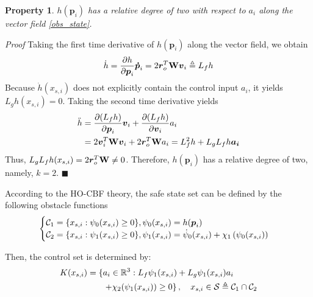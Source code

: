 \documentclass[lettersize,journal]{IEEEtran}
\newtheorem{property}{Property}
\begin{document}
\begin{property}
	$h({{\boldsymbol{p}}_i})$ has a relative degree of two with respect to $a_i$ along the vector field \eqref{obs_state}.
\end{property}

\textit{Proof}
	Taking the first time derivative of $h({{\boldsymbol{p}}_i})$ along the vector field, we obtain
	\begin{equation}
		\dot h = \frac{{\partial h}}{{\partial {{\boldsymbol{p}}_i}}}{\boldsymbol{\dot p}}_i = 2{\boldsymbol{r}}_o^T{\bf{W}}{{\boldsymbol{v}}_i} \triangleq {L_f}h
	\end{equation}
	Because $\dot{h}(x_{s,i})$ does not explicitly contain the control input $a_i$, it yields $L_g h(x_{s,i}) = 0$. Taking the second time derivative yields
\begin{equation}
	\begin{split}
		\ddot h &= \frac{{\partial ({L_f}h)}}{{\partial {{\boldsymbol{p}}_i}}}{{\boldsymbol{v}}_i} + \frac{{\partial ({L_f}h)}}{{\partial {{\boldsymbol{v}}_i}}}{a_i} \\
		&= 2{\boldsymbol{v}}_i^T{\bf{W}}{{\boldsymbol{v}}_i} + 2{\boldsymbol{r}}_o^T{\bf{W}}{a_i}= L_f^2h + {L_g}{L_f}h \boldsymbol{a_i}
	\end{split}
\end{equation}
	Thus, $L_g L_f h(x_{s,i}) =  2{\boldsymbol{r}}_o^T{\bf{W}} \neq 0$. Therefore, $h({{\boldsymbol{p}}_i})$ has a relative degree of two, namely, $k=2$. \hfill $\blacksquare$


According to the HO-CBF theory, the safe state set can be defined by the following obstacle functions
\begin{equation}
	\label{obs_func}
	\begin{cases}
		{{\cal C}_1} = \{ {x_{s,i}}:{\psi _0}({x_{s,i}}) \ge 0\}, {\psi _0}({x_{s,i}}) = h({{\boldsymbol{p}}_i})\\
		{{\cal C}_2} = \{ {x_{s,i}}:{\psi _1}({x_{s,i}}) \ge 0\}, {\psi _1}({x_{s,i}}) = {{\dot \psi }_0}({x_{s,i}}) + {\chi _1}\left( {{\psi _0}({x_{s,i}})} \right)
	\end{cases}
\end{equation}

Then, the control set is determined by:
\begin{equation}
	\begin{split}
		K({x_{s,i}}) = \{ & a_i \in {\mathbb{R}^3} : L_{f}{\psi _1}({x_{s,i}}) + {L_{g}}{\psi _1}({x_{s,i}})a_i \\
		& \left. + {\chi _2}({\psi _1}({x_{s,i}})) \ge 0 \right\}, \quad {x_{s,i}} \in {\cal S} \triangleq {{\cal C}_1} \cap {{\cal C}_2}
	\end{split}
\end{equation}
\end{document}
